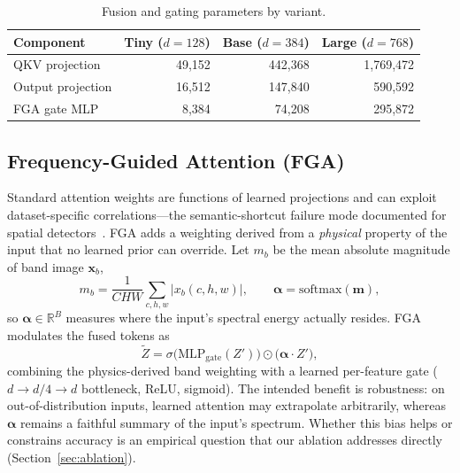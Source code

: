 \documentclass[journal]{IEEEtran}
\begin{document}
\begin{table}[!t]
\renewcommand{\arraystretch}{1.2}
\caption{Fusion and gating parameters by variant.}
\label{tab:attnparams}
\centering
\setlength{\tabcolsep}{3pt}
\begin{tabular}{lrrr}
\toprule
Component & Tiny ($d{=}128$) & Base ($d{=}384$) & Large ($d{=}768$) \\
\midrule
QKV projection   & 49{,}152  & 442{,}368 & 1{,}769{,}472 \\
Output projection& 16{,}512  & 147{,}840 & 590{,}592 \\
FGA gate MLP     & 8{,}384   & 74{,}208  & 295{,}872 \\
\bottomrule
\end{tabular}
\end{table}

\subsection{Frequency-Guided Attention (FGA)}
\label{sec:fga}
Standard attention weights are functions of learned projections and can exploit dataset-specific correlations---the semantic-shortcut failure mode documented for spatial detectors~\cite{shuai2026shortcuts}. FGA adds a weighting derived from a \emph{physical} property of the input that no learned prior can override. Let $m_b$ be the mean absolute magnitude of band image $\mathbf{x}_b$,
\begin{equation}
m_b = \frac{1}{CHW}\sum_{c,h,w} \left| x_b(c,h,w) \right|, \qquad \boldsymbol{\alpha} = \mathrm{softmax}(\mathbf{m}),
\label{eq:alpha}
\end{equation}
so $\boldsymbol{\alpha} \in \mathbb{R}^{B}$ measures where the input's spectral energy actually resides. FGA modulates the fused tokens as
\begin{equation}
\tilde{Z} = \sigma\!\big(\mathrm{MLP}_{\mathrm{gate}}(Z')\big) \odot \big(\boldsymbol{\alpha} \cdot Z'\big),
\label{eq:fga}
\end{equation}
combining the physics-derived band weighting with a learned per-feature gate ($d \rightarrow d/4 \rightarrow d$ bottleneck, ReLU, sigmoid). The intended benefit is robustness: on out-of-distribution inputs, learned attention may extrapolate arbitrarily, whereas $\boldsymbol{\alpha}$ remains a faithful summary of the input's spectrum. Whether this bias helps or constrains accuracy is an empirical question that our ablation addresses directly (Section~\ref{sec:ablation}).
\end{document}
